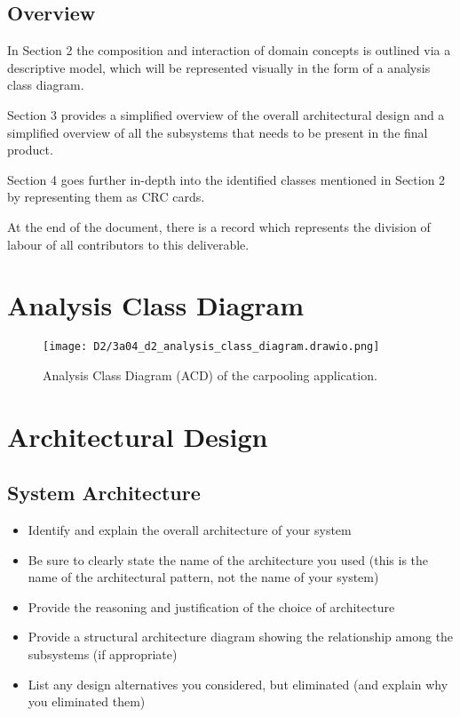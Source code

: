 \documentclass[]{article}
\begin{document}
\subsection{Overview}
\label{sub:overview}
In Section 2 the composition and interaction of domain concepts is outlined via a descriptive model, which will be represented visually in the form of a analysis class diagram. 

Section 3 provides a simplified overview of the overall architectural design and a simplified overview of all the subsystems that needs to be present in the final product. 

Section 4 goes further in-depth into the identified classes mentioned in Section 2 by representing them as CRC cards. 

At the end of the document, there is a record which represents the division of labour of all contributors to this deliverable.



\pagebreak
\section{Analysis Class Diagram}
\label{sec:analysis_class_diagram}
\begin{figure}[h]
	\centering
	\texttt{[image: D2/3a04\_d2\_analysis\_class\_diagram.drawio.png]}
	\caption{Analysis Class Diagram (ACD) of the carpooling application.}
	\label{fig:acd}
\end{figure}


\section{Architectural Design}
\label{sec:architectural_design}

\subsection{System Architecture}
\label{sub:system_architecture}
\begin{itemize}
	\item Identify and explain the overall architecture of your system
	\item Be sure to clearly state the name of the architecture you used (this is the name of the architectural pattern, not the name of your system)
	\item Provide the reasoning and justification of the choice of architecture
	\item Provide a structural architecture diagram showing the relationship among the subsystems (if appropriate)
	\item List any design alternatives you considered, but eliminated (and explain why you eliminated them)
\end{itemize}
\end{document}
